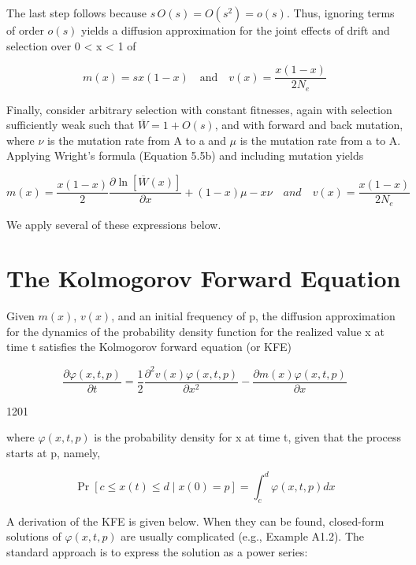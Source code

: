 \documentclass{article}
\begin{document}
The last step follows because  $  s\,O(s) = O(s^2) = o(s)  $. Thus, ignoring terms of order  $  o(s)  $ yields a diffusion approximation for the joint effects of drift and selection over 0 < x < 1 of

\begin{equation}
m(x)=s x(1-x)\quad\mathrm{a n d}\quad v(x)=\frac{x(1-x)}{2N_{e}}
\end{equation}

Finally, consider arbitrary selection with constant fitnesses, again with selection sufficiently weak such that  $ \overline{W} = 1 + O(s) $, and with forward and back mutation, where  $ \nu $ is the mutation rate from A to a and  $ \mu $ is the mutation rate from a to A. Applying Wright's formula (Equation 5.5b) and including mutation yields

\begin{equation}
m(x)=\frac{x(1-x)}{2}\frac{\partial\ln[\overline{W}(x)]}{\partial x}+(1-x)\mu-x\nu\quad and\quad v(x)=\frac{x(1-x)}{2N_{e}}
\end{equation}

We apply several of these expressions below.

\section{The Kolmogorov Forward Equation}
Given  $ m(x) $,  $ v(x) $, and an initial frequency of p, the diffusion approximation for the dynamics of the probability density function for the realized value x at time t satisfies the Kolmogorov forward equation (or KFE)

\begin{equation}
\frac{\partial\varphi(x,t,p)}{\partial t}=\frac{1}{2}\frac{\partial^{2}v(x)\varphi(x,t,p)}{\partial x^{2}}-\frac{\partial m(x)\varphi(x,t,p)}{\partial x}
\end{equation}

1201

where  $ \varphi(x,t,p) $ is the probability density for x at time t, given that the process starts at p, namely,

\begin{equation}
\Pr[c\leq x(t)\leq d\mid x(0)=p]=\int_{c}^{d}\varphi(x,t,p)dx
\end{equation}

A derivation of the KFE is given below. When they can be found, closed-form solutions of  $ \varphi(x,t,p) $ are usually complicated (e.g., Example A1.2). The standard approach is to express the solution as a power series:
\end{document}
